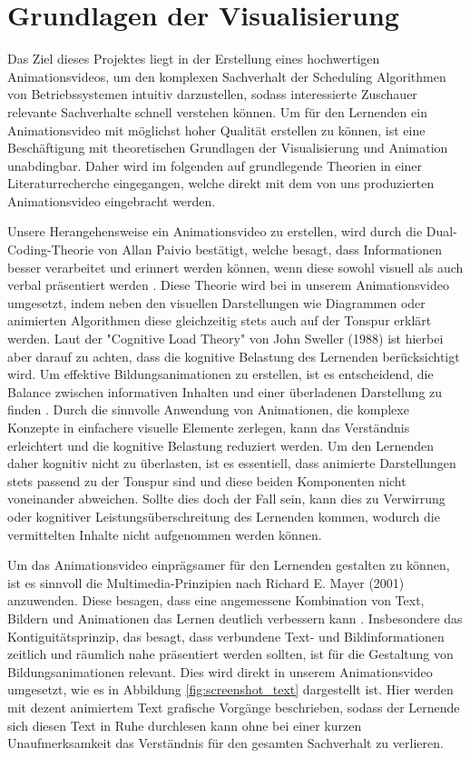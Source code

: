 
\chapter{Grundlagen der Visualisierung}
Das Ziel dieses Projektes liegt in der Erstellung eines hochwertigen Animationsvideos, um den komplexen Sachverhalt der Scheduling Algorithmen von Betriebssystemen intuitiv darzustellen, sodass interessierte Zuschauer relevante Sachverhalte schnell verstehen können. Um für den Lernenden ein Animationsvideo mit möglichst hoher Qualität erstellen zu können, ist eine Beschäftigung mit theoretischen Grundlagen der Visualisierung und Animation unabdingbar. Daher wird im folgenden auf grundlegende Theorien in einer Literaturrecherche eingegangen, welche direkt mit dem von uns produzierten Animationsvideo eingebracht werden. 

Unsere Herangehensweise ein Animationsvideo zu erstellen, wird durch die Dual-Coding-Theorie von Allan Paivio bestätigt, welche besagt, dass Informationen besser verarbeitet und erinnert werden können, wenn diese sowohl visuell als auch verbal präsentiert werden \autocite{paivio_dual_1991}. Diese Theorie wird bei in unserem Animationsvideo umgesetzt, indem neben den visuellen Darstellungen wie Diagrammen oder animierten Algorithmen diese gleichzeitig stets auch auf der Tonspur erklärt werden. Laut der "Cognitive Load Theory" von John Sweller (1988) ist hierbei aber darauf zu achten, dass die kognitive Belastung des Lernenden berücksichtigt wird. Um effektive Bildungsanimationen zu erstellen, ist es entscheidend, die Balance zwischen informativen Inhalten und einer überladenen Darstellung zu finden \autocite{sweller_cognitive_2011}. Durch die sinnvolle Anwendung von Animationen, die komplexe Konzepte in einfachere visuelle Elemente zerlegen, kann das Verständnis erleichtert und die kognitive Belastung reduziert werden. Um den Lernenden daher kognitiv nicht zu überlasten, ist es essentiell, dass animierte Darstellungen stets passend zu der Tonspur sind und diese beiden Komponenten nicht voneinander abweichen. Sollte dies doch der Fall sein, kann dies zu Verwirrung oder kognitiver Leistungsüberschreitung des Lernenden kommen, wodurch die vermittelten Inhalte nicht aufgenommen werden können. 

Um das Animationsvideo einprägsamer für den Lernenden gestalten zu können, ist es sinnvoll die Multimedia-Prinzipien nach Richard E. Mayer (2001) anzuwenden. Diese besagen, dass eine angemessene Kombination von Text, Bildern und Animationen das Lernen deutlich verbessern kann \autocite{mayer_multimedia_2002}. Insbesondere das Kontiguitätsprinzip, das besagt, dass verbundene Text- und Bildinformationen zeitlich und räumlich nahe präsentiert werden sollten, ist für die Gestaltung von Bildungsanimationen relevant. Dies wird direkt in unserem Animationsvideo umgesetzt, wie es in Abbildung \ref{fig:screenshot_text} dargestellt ist. Hier werden mit dezent animiertem Text grafische Vorgänge beschrieben, sodass der Lernende sich diesen Text in Ruhe durchlesen kann ohne bei einer kurzen Unaufmerksamkeit das Verständnis für den gesamten Sachverhalt zu verlieren. 

